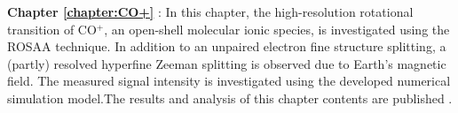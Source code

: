 \textbf{Chapter \ref{chapter:CO+}} \emph{}: In this chapter, the high-resolution rotational transition of CO$^+$, an open-shell molecular ionic species, is investigated using the ROSAA technique. In addition to an unpaired electron fine structure splitting, a (partly) resolved hyperfine Zeeman splitting is observed due to Earth's magnetic field. The measured signal intensity is investigated using the developed numerical simulation model.The results and analysis of this chapter contents are published \cite{marimuthu_zeeman_2022}.\\

